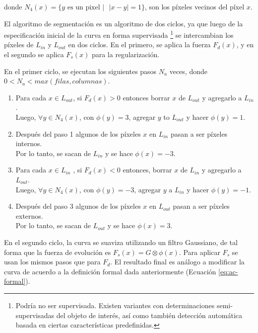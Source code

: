 \documentclass[a4paper,10pt]{article}
\begin{document}
donde $N_{4}(x) = \{ y \mbox{ es un pixel } \vert \mbox{   } |x-y| = 1 \}$, son los píxeles
vecinos del píxel $x$.

El algoritmo de segmentación es un algoritmo de dos ciclos, ya que luego de la
especificación inicial de la curva en forma supervisada \footnote{Podría no ser
supervisada. Existen variantes con determinaciones semi-supervisadas del objeto
de interés, así como también detección automática basada en ciertas
características predefinidas.} se intercambian los píxeles de $L_{in}$ y
$L_{out}$ en dos ciclos. En el primero, se aplica la fuerza $F_{d}(x)$, y en el
segundo se aplica $F_{s}(x)$ para la regularización.

En el primer ciclo, se ejecutan los siguientes pasos $N_{a}$ veces, donde $ 0 <
N_{a} < max(filas, columnas)$.

\begin{enumerate}

    \item Para cada $x \in L_{out}$, si $F_{d}(x) > 0$ entonces borrar $x$ de $L_{out}$ y agregarlo a $L_{in}$. \\
    Luego, $\forall y \in N_{4}(x)$, con $\phi(y) = 3$, agregar $y$ to $L_{out}$ y hacer $\phi(y) = 1$.

    \item Después del paso 1 algunos de los píxeles $x$ en $L_{in}$ pasan a ser píxeles internos. \\
    Por lo tanto, se sacan de $L_{in}$ y se hace $\phi(x) = -3$.

    \item Para cada $x \in L_{in}$ , si $F_{d}(x) < 0$ entonces, borrar $x$ de $L_{in}$ y agregarlo a $L_{out}$. \\
    Luego, $\forall y \in N_{4}(x)$, con $\phi(y) = -3$, agregar $y$ a $L_{in}$ y hacer $\phi(y) = -1$.


    \item Después del paso 3 algunos de los píxeles $x$ en $L_{out}$ pasan a ser píxeles externos. \\
    Por lo tanto, se sacan de $L_{out}$ y se hace $\phi(x) = 3$.

\end{enumerate}

En el segundo ciclo, la curva se suaviza utilizando un filtro Gaussiano, de tal
forma que la fuerza de evolución es $F_{s}(x) = G \otimes \phi(x)$. Para aplicar $F_s$ se usan los mismos
pasos que para $F_d$. El resultado final es análogo a modificar la curva de acuerdo
a la definición formal dada anteriormente (Ecuación \ref{eq:ac-formal}).
\end{document}
